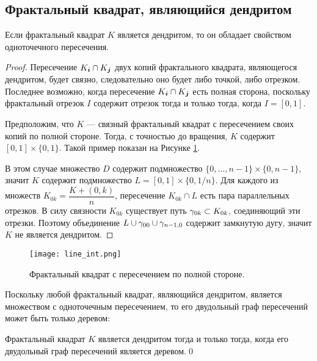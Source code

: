 \subsection{Фрактальный квадрат, являющийся дендритом}

\begin{proposition}
\label{thm:den_necessary_sufficient}
Если фрактальный квадрат $K$ является дендритом, то он обладает свойством одноточечного пересечения.
\end{proposition}

\begin{proof}
Пересечение $K_{\bm{i}}\cap K_{\bm{j}}$ двух копий фрактального квадрата, являющегося дендритом, будет связно, следовательно оно будет либо точкой, либо отрезком.
Последнее возможно, когда пересечение $K_{\bm{i}}\cap K_{\bm{j}}$ есть полная сторона, поскольку фрактальный отрезок $I$ содержит отрезок тогда и только тогда, когда $I=[0, 1]$. 

Предположим, что $K$ --- связный фрактальный квадрат с пересечением своих копий по полной стороне. 
Тогда, с точностью до вращения, $K$ содержит $[0,1]\times\{0,1\}$.
Такой пример показан на Рисунке \ref{fig:line_int}.

В этом случае множество $D$ содержит подмножество $ \{0,\ldots,n-1\}\times \{0,n-1\}$, значит $K$ содержит подмножество $L=[0,1]\times\{0,1/n\}$. 
Для каждого из множеств $K_{0k}=\dfrac{K+(0,k)}{n}$, пересечение $K_{0k}\cap L$ есть пара параллельных отрезков. 
В силу связности $K_{0k}$ существует путь $\gamma_{0k}\subset K_{0k}$, соединяющий эти  отрезки. 
Поэтому объединение $L\cup\gamma_{00}\cup\gamma_{n-1,0}$ содержит замкнутую дугу, значит $K$ не является дендритом. 
\end{proof}

\begin{figure}[H]
 \centering
 \texttt{[image: line\_int.png]}
 \caption{Фрактальный квадрат с пересечением по полной стороне.}
 \label{fig:line_int}
\end{figure}

Поскольку любой фрактальный квадрат, являющийся дендритом, является множеством с одноточечным пересечением, то его двудольный граф пересечений может быть только деревом:

\begin{corollary}\label{cor:fsden}
Фрактальный квадрат $K$ является дендритом тогда и только тогда, когда его двудольный граф пересечений является деревом.\hfill\qed
\end{corollary}


